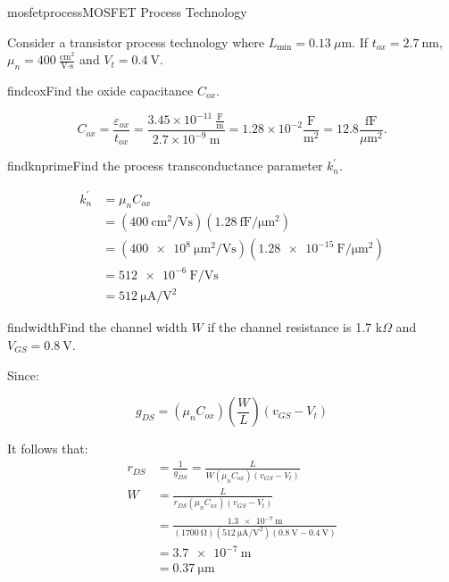 \begin{mainquestion}{mosfetprocess}{MOSFET Process Technology}

Consider a transistor process technology where $L_{\text{min}} = 0.13\ \mu\text{m}$. If $t_{ox} = 2.7\ \text{nm}$, $\mu_{n} = 400\ \frac{\text{cm}^{2}}{\text{V}\cdot\text{s}}$ and $V_{t} = 0.4\ \text{V}$.

\begin{partquestion}{findcox}{Find the oxide capacitance $C_{ox}$.}
\begin{answer}
\[
C_{ox} = \frac{\varepsilon_{ox}}{t_{ox}} = \frac{3.45 \times 10^{-11}\ \frac{\text{F}}{\text{m}}}{2.7 \times 10^{-9}\ \text{m}} = 1.28 \times 10^{-2} \frac{\text{F}}{\text{m}^{2}} = 12.8 \frac{\text{fF}}{\mu\text{m}^{2}}.
\]
\end{answer}
\end{partquestion}

\begin{partquestion}{findknprime}{Find the process transconductance parameter $k_{n}^{\prime}$.}
\begin{answer}
\begin{align*}
    k_{n}^{\prime} &= \mu_{n}C_{ox}\\
    &= (\qty{400}{\centi\meter^2/\volt\second})(\qty{1.28}{\femto\farad/\micro\meter^2}) \\
    &= (\qty{400e8}{\micro\meter^2/\volt\second})(\qty{1.28e-15}{\farad/\micro\meter^2}) \\
    &= \qty{512e-6}{\farad/\volt\second} \\
    &= \qty{512}{\unit{\micro\ampere}/\unit{\volt}^2}
\end{align*}
\end{answer}
\end{partquestion}

\begin{partquestion}{findwidth}{Find the channel width $W$ if the channel resistance is 1.7 k$\Omega$ and $V_{GS} = 0.8\ \text{V}$.}
\begin{answer}
Since:

\[
g_{DS} = (\mu_{n} C_{ox})\left(\frac{W}{L}\right)(v_{GS} - V_{t})
\]

It follows that:
\begin{align*}
    r_{DS} &= \frac{1}{g_{DS}} = \frac{L}{W(\mu_n C_{ox})(v_{GS} - V_t)} \\
    W &= \frac{L}{r_{DS} (\mu_n C_{ox})(v_{GS} - V_t)} \\
    &= \frac{\qty{1.3e-7}{\meter}}{(\qty{1700}{\ohm}) (\qty{512}{\unit{\micro\ampere}/\unit{\volt}^2})(\qty{0.8}{\volt} - \qty{0.4}{\volt})} \\
    &= \qty{3.7e-7}{\meter} \\
    &= \qty{0.37}{\micro\meter}
\end{align*}
\end{answer}
\end{partquestion}


\end{mainquestion}
